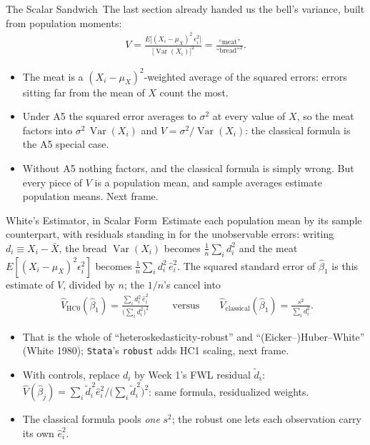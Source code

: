 \documentclass[aspectratio=169,11pt,xcolor=dvipsnames]{beamer}
\newcommand{\srct}[1]{#1}                               %
\DeclareMathOperator{\Var}{Var}
\newcommand{\E}{E}
\newcommand{\core}{\,\raisebox{0.6pt}{\textcolor{corestar}{$\bigstar$}}}
\begin{document}
\begin{frame}{The Scalar Sandwich\core}
The last section already handed us the bell's variance, built from population moments:
\begin{align*}
  V = \frac{\E\big[(X_i-\mu_X)^2\,\epsilon_i^2\big]}{\big[\Var(X_i)\big]^2}
    = \frac{\text{``meat''}}{\text{``bread''}^2} .
\end{align*}
\begin{itemize}\itemsep3pt
  \item The meat is a \alert{$(X_i-\mu_X)^2$-weighted average of the squared
        errors}: errors sitting far from the mean of $X$ count the most.
  \item Under A5 the squared error averages to $\sigma^2$ at every value of
        $X$, so the meat factors into $\sigma^2\,\Var(X_i)$ and
        $V = \sigma^2/\Var(X_i)$: \alert{the classical formula is the A5
        special case.}
  \item Without A5 nothing factors, and the classical formula is simply
        wrong. But every piece of $V$ is a population mean, and
        \alert{sample averages estimate population means}. Next frame.
\end{itemize}
\end{frame}

\begin{frame}{White's Estimator, in Scalar Form\core}
Estimate each population mean by its sample counterpart, with residuals
standing in for the unobservable errors: writing $d_i \equiv X_i - \bar X$,
the bread $\Var(X_i)$ becomes $\frac1n\sum_i d_i^2$ and the meat
$\E[(X_i-\mu_X)^2\epsilon_i^2]$ becomes $\frac1n\sum_i d_i^2\,\hat e_i^2$.
The squared standard error of $\hat\beta_1$ is this estimate of $V$,
divided by $n$; the $1/n$'s cancel into
\begin{align*}
  \boxed{\;
  \hat{V}_{\text{HC0}}(\hat\beta_1)
  = \frac{\sum_i d_i^2\,\hat e_i^2}{\big(\sum_i d_i^2\big)^2} \;}
  \qquad
  \text{versus}\qquad
  \hat{V}_{\text{classical}}(\hat\beta_1) = \frac{s^2}{\sum_i d_i^2} .
\end{align*}
\begin{itemize}\itemsep2pt
  \item That is the whole of ``heteroskedasticity-robust'' and
        ``(Eicker--)Huber--White'' (\srct{White 1980}); \texttt{Stata}'s
        \texttt{robust} adds HC1 scaling, next frame.
  \item With controls, replace $d_i$ by Week 1's FWL residual $\tilde d_i$:
        $\hat V(\hat\beta_j) = \sum_i \tilde d_i^{\,2}\hat e_i^2 \big/
        \big(\sum_i \tilde d_i^{\,2}\big)^2$: same formula, residualized weights.
  \item The classical formula pools \emph{one} $s^2$; the robust one lets
        each observation carry its own $\hat e_i^2$.
\end{itemize}
\end{frame}
\end{document}
